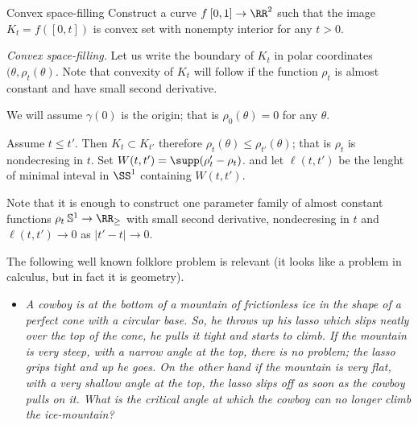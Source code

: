 \begin{pr}{\thm}{Convex space-filling}\label{Convex space-filling}
Construct a curve $f\:[0,1]\to \RR^2$
such that 
the image $K_t=f([0,t])$ is convex set with nonempty interior
for any $t>0$. 
\end{pr}

\textit{Convex space-filling.}
Let us write the boundary of $K_t$
in polar coordinates $(\theta,\rho_t(\theta)$.
Note that convexity of $K_t$ will follow if the function $\rho_t$ is almost constant and have small second derivative.

We will assume $\gamma(0)$ is the origin;
that is $\rho_0(\theta)=0$ for any $\theta$.

Assume $t\le t'$.
Then $K_t\subset K_{t'}$ 
therefore 
$\rho_t(\theta)\le \rho_{t'}(\theta)$;
that is $\rho_t$ is nondecresing in $t$.
Set $W(t,t')=\supp(\rho_t'-\rho_t)$.
and let $\ell(t,t')$ be the lenght of minimal inteval in $\SS^1$ containing $W(t,t')$.

Note that it is enough to construct one parameter family of almost constant functions $\rho_t\:\mathbb{S}^1\to \RR_\ge$
with small second derivative,
nondecresing in $t$ and $\ell(t,t')\to 0$ as $|t'-t|\to 0$.















The following well known folklore problem is relevant
(it looks like a problem in calculus, but in fact it is geometry).

\begin{itemize}
\item \textit{ 
A cowboy is at the bottom of a mountain of frictionless ice in the shape of a perfect cone with a circular base. 
So, he throws up his lasso which slips neatly over the top of the cone, he pulls it tight and starts to climb. If the mountain is very steep, with a narrow angle at the top, there is no problem; the lasso grips tight and up he goes. On the other hand if the mountain is very flat, with a very shallow angle at the top, the lasso slips off as soon as the cowboy pulls on it. 
What is the critical angle at which the cowboy can no longer climb the ice-mountain?}
\end{itemize}


